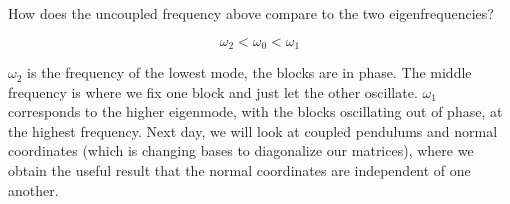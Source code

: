 \begin{p}
How does the uncoupled frequency above compare to the two eigenfrequencies?
\end{p}
\begin{s}
\[\omega_2 < \omega_0 < \omega_1\]
\end{s}
\noindent$\omega_2$ is the frequency of the lowest mode, the blocks are in phase. The middle frequency is where we fix one block and just let the other oscillate. $\omega_1$ corresponds to the higher eigenmode, with the blocks oscillating out of phase, at the highest frequency. Next day, we will look at coupled pendulums and normal coordinates (which is changing bases to diagonalize our matrices), where we obtain the useful result that the normal coordinates are independent of one another.